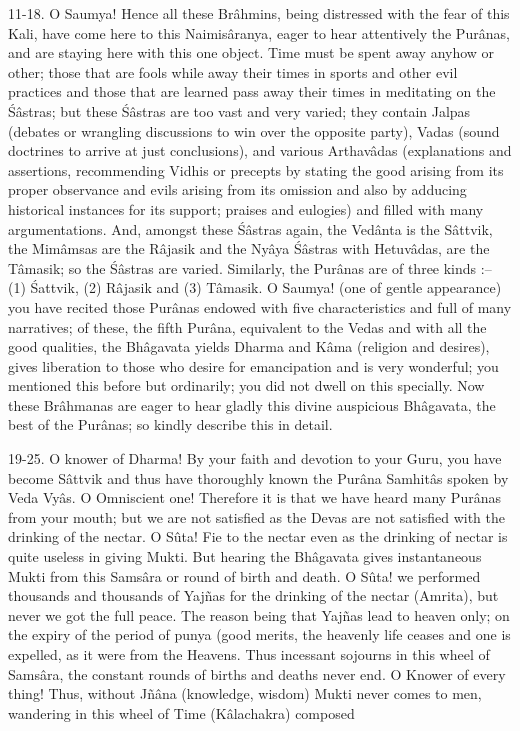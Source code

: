 11-18. O Saumya! Hence all these Br\^ahmins, being distressed with the fear of this Kali, have come here to this Naimis\^aranya, eager to hear attentively the Pur\^anas, and are staying here with this one object. Time must be spent away anyhow or other; those that are fools while away their times in sports and other evil practices and those that are learned pass away their times in meditating on the \'S\^astras; but these \'S\^astras are too vast and very varied; they contain Jalpas (debates or wrangling discussions to win over the opposite party), Vadas (sound doctrines to arrive at just conclusions), and various Arthav\^adas (explanations and assertions, recommending Vidhis or precepts by stating the good arising from its proper observance and evils arising from its omission and also by adducing historical instances for its support; praises and eulogies) and filled with many argumentations. And, amongst these \'S\^astras again, the Ved\^anta is the S\^attvik, the Mim\^amsas are the R\^ajasik and the Ny\^aya \'S\^astras with Hetuv\^adas, are the T\^amasik; so the \'S\^astras are varied. Similarly, the Pur\^anas are of three kinds :-- (1) \'Sattvik, (2) R\^ajasik and (3) T\^amasik. O Saumya! (one of gentle appearance) you have recited those Pur\^anas endowed with five characteristics and full of many narratives; of these, the fifth Pur\^ana, equivalent to the Vedas and with all the good qualities, the Bh\^agavata yields Dharma and K\^ama (religion and desires), gives liberation to those who desire for emancipation and is very wonderful; you mentioned this before but ordinarily; you did not dwell on this specially. Now these Br\^ahmanas are eager to hear gladly this divine auspicious Bh\^agavata, the best of the Pur\^anas; so kindly describe this in detail.

19-25. O knower of Dharma! By your faith and devotion to your Guru, you have become S\^attvik and thus have thoroughly known the Pur\^ana Samhit\^as spoken by Veda Vy\^as. O Omniscient one! Therefore it is that we have heard many Pur\^anas from your mouth; but we are not satisfied as the Devas are not satisfied with the drinking of the nectar. O S\^uta! Fie to the nectar even  as the drinking of nectar is quite useless in giving Mukti. But hearing the Bh\^agavata gives instantaneous Mukti from this Sams\^ara or round of birth and death. O S\^uta! we performed thousands and thousands of Yajñas for the drinking of the nectar (Amrita), but never we got the full peace. The reason being that Yajñas lead to heaven only; on the expiry of the period of punya (good merits, the heavenly life ceases and one is expelled, as it were from the Heavens. Thus incessant sojourns in this wheel of Sams\^ara, the constant rounds of births and deaths never end. O Knower of every thing! Thus, without Jñ\^ana (knowledge, wisdom) Mukti never comes to men, wandering in this wheel of Time (K\^alachakra) composed

